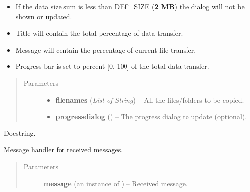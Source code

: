 \documentclass[letterpaper,10pt,english]{sphinxmanual}
\begin{document}
\begin{fulllineitems}
\begin{fulllineitems}
\begin{description}
\begin{itemize}
\item {} 
If the data size sum is less than DEF\_SIZE (\textbf{2 MB}) the             dialog will not be shown or updated.

\item {} 
Title will contain the total percentage of data transfer.

\item {} 
Message will contain the percentage of current file transfer.

\item {} 
Progress bar is set to percent {[}0, 100{]} of the total data             transfer.

\end{itemize}

\end{description}
\begin{quote}\begin{description}
\item[{Parameters}] \leavevmode\begin{itemize}
\item {} 
\textbf{filenames} (\emph{List of String}) -- All the files/folders to be copied.

\item {} 
\textbf{progressdialog} () -- The progress dialog to update (optional).

\end{itemize}

\end{description}\end{quote}

\end{fulllineitems}


\begin{fulllineitems}
\label{state:state.State.initialize}
Docstring.

\end{fulllineitems}


\begin{fulllineitems}
\label{state:state.State.message_handler}
Message handler for received messages.
\begin{quote}\begin{description}
\item[{Parameters}] \leavevmode
\textbf{message} (an instance of {\hyperref[swnp:swnp.Message]{}}) -- Received message.


\end{description}
\end{quote}
\end{fulllineitems}
\end{fulllineitems}
\end{document}
